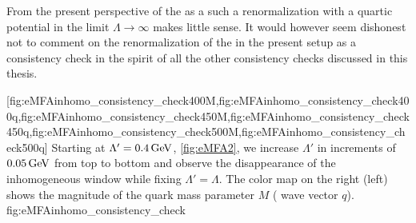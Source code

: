 From the present perspective of the \qmm{} as a \loeft{} such a renormalization with a quartic potential in the limit $\Lambda\rightarrow\infty$ makes little sense.
It would however seem dishonest not to comment on the renormalization of the \qmm{} in the present setup as a consistency check in the spirit of all the other consistency checks discussed in this thesis.

	[fig:eMFAinhomo_consistency_check400M,fig:eMFAinhomo_consistency_check400q,fig:eMFAinhomo_consistency_check450M,fig:eMFAinhomo_consistency_check450q,fig:eMFAinhomo_consistency_check500M,fig:eMFAinhomo_consistency_check500q]%
	{%
		Starting at $\Lambda'=0.4\,\mathrm{GeV}$, \cf{} \cref{fig:eMFA2}, we increase $\Lambda'$ in increments of $0.05\,\mathrm{GeV}$ from top to bottom and observe the disappearance of the inhomogeneous window while fixing $\Lambda'=\Lambda$. The color map on the right (left) shows the magnitude of the quark mass parameter $M$ (\cdw{} wave vector $q$).
	}%
	{fig:eMFAinhomo_consistency_check}%
